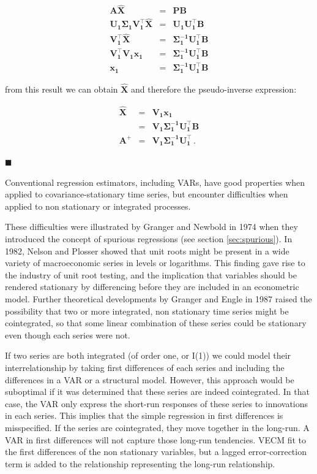 \begin{eqnarray*}
\mathbf{A \hat{X}} &=& \mathbf{PB} \\
\mathbf{U_1 \Sigma_1 V_1^\top \hat{X}} &=& \mathbf{U_1 U_1^\top B} \\
\mathbf{ V_1^\top \hat{X}} &=&  \mathbf{\Sigma_1^{-1} U_1^\top B} \\ 
\mathbf{ V_1^\top V_1 x_1} &=& \mathbf{\Sigma_1^{-1}
U_1^\top B} \\
\mathbf{x_1}&=& \mathbf{\Sigma_1^{-1} U_1^\top B}
\end{eqnarray*}

\noindent from this result we can obtain $\mathbf{\hat{X}}$ and
therefore the pseudo-inverse expression:

\begin{eqnarray*}
\mathbf{\hat{X}} &=& \mathbf{V_1 x_1} \\
                &=& \mathbf{V_1 \Sigma_1^{-1} U_1^\top B} \\
\mathbf{A^+} &=& \mathbf{V_1 \Sigma_1^{-1} U_1^\top} \, .
\end{eqnarray*}

$\blacksquare$



\newpage
Conventional regression estimators, including VARs, have good properties when
applied to covariance-stationary time series, but encounter difficulties when
applied to non stationary or integrated processes.

These difficulties were illustrated by Granger and Newbold in 1974
\cite{granger1974} when they introduced the concept of spurious regressions
(see section \ref{sec:spurious}). In 1982, Nelson and Plosser \cite{nelson1982}
showed that unit roots might be present in a wide variety of macroeconomic
series in levels or logarithms. This finding gave rise to the industry of unit
root testing, and the implication that variables should be rendered stationary
by differencing before they are included in an econometric model.  Further
theoretical developments by Granger and Engle in 1987 \cite{engle87} raised the
possibility that two or more integrated, non stationary time series might be
cointegrated, so that some linear combination of these series could be
stationary even though each series were not. 

If two series are both integrated (of order one, or I(1)) we could model their
interrelationship by taking first differences of each series and including the
differences in a VAR or a structural model.  However, this approach would be
suboptimal if it was determined that these series are indeed cointegrated. In
that case, the VAR only express the short-run responses of these series to
innovations in each series. This implies that the simple regression in first
differences is misspecified.  If the series are cointegrated, they move
together in the long-run. A VAR in first differences will not capture those
long-run tendencies.  VECM fit to the first differences of the non stationary
variables, but a lagged error-correction term is added to the relationship
representing the long-run relationship.

